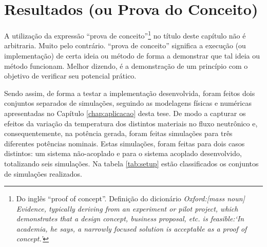 \chapter{Resultados (ou Prova do Conceito)}
\label{chap:resultados}


A utilização da expressão ``prova de conceito''\footnote{Do inglês ``proof of concept''. Definição do dicionário
  \textit{Oxford:[mass noun] Evidence, typically deriving from an experiment or pilot project, which demonstrates that a design concept,
    business proposal, etc. is feasible:‘In academia, he says, a narrowly focused solution is acceptable as a proof of concept.’}}
no título deste capítulo não é arbitraria.
Muito pelo contrário. ``prova de conceito'' significa a execução (ou implementação) de
certa ideia ou método de forma a demonstrar que tal ideia ou método funcionam. Melhor dizendo,
é a demonstração de um princípio com o objetivo de verificar seu potencial prático.

Sendo assim, de forma a testar a implementação desenvolvida, foram feitos dois conjuntos
separados de simulações, seguindo as modelagens físicas e numéricas apresentadas no Capítulo \ref{chap:aplicacao}
desta tese. De modo a capturar os efeitos da variação da temperatura dos distintos materiais
no fluxo neutrônico e, consequentemente, na potência gerada, foram feitas simulações
para três diferentes potências nominais. Estas simulações, foram feitas para dois casos
distintos: um sistema não-acoplado e para o sistema acoplado desenvolvido, totalizando seis
simulações. Na tabela
\ref{tab:setup} estão classificados os conjuntos de simulações realizados.

